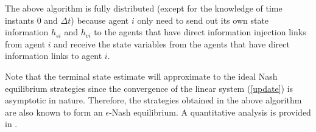 \documentclass[letterpaper, 10 pt, conference,onecolumn]{ieeeconf}  %
\begin{document}
The above algorithm is fully distributed (except for the knowledge of time instants 0 and $\Delta t$) because agent $i$ only need to send out its own state information $h_{si}$ and $h_{vi}$ to the agents that have direct information injection links from agent $i$ and receive the state variables from the agents that have direct information links to agent $i$.
%

{Note that the terminal state estimate will approximate to the ideal Nash equilibrium strategies since the convergence of the linear system (\ref{update}) is asymptotic in nature. Therefore, the strategies obtained in the above algorithm are also known to form an $\epsilon$-Nash equilibrium. A quantitative analysis is provided in \cite{LinThesis}.}
\end{document}
